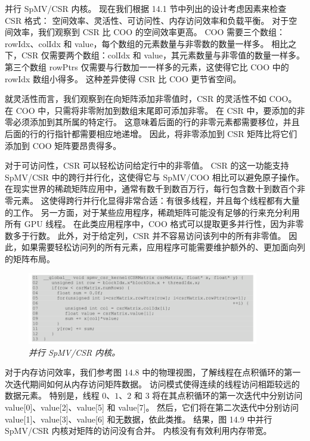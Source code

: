 并行 SpMV/CSR 内核。 现在我们根据 14.1 节中列出的设计考虑因素来检查 CSR 格式：
空间效率、灵活性、可访问性、内存访问效率和负载平衡。 对于空间效率，我们观察到 CSR 比 COO 的空间效率更高。 
COO 需要三个数组：rowIdx、colIdx 和 value，每个数组的元素数量与非零数的数量一样多。 
相比之下，CSR 仅需要两个数组：colIdx 和 value，其元素数量与非零值的数量一样多。 
第三个数组 rowPtrs 仅需要与行数加一一样多的元素，这使得它比 COO 中的 rowIdx 数组小得多。 
这种差异使得 CSR 比 COO 更节省空间。

就灵活性而言，我们观察到在向矩阵添加非零值时，CSR 的灵活性不如 COO。 
在 $\mathrm{COO}$ 中，只需将非零附加到数组末尾即可添加非零。 在 CSR 中，要添加的非零必须添加到其所属的特定行。 
这意味着后面的行的非零元素都需要移位，并且后面的行的行指针都需要相应地递增。 
因此，将非零添加到 CSR 矩阵比将它们添加到 $\mathrm{COO}$ 矩阵要昂贵得多。

对于可访问性，CSR 可以轻松访问给定行中的非零值。 
CSR 的这一功能支持 SpMV/CSR 中的跨行并行化，这使得它与 SpMV/COO 相比可以避免原子操作。 
在现实世界的稀疏矩阵应用中，通常有数千到数百万行，每行包含数十到数百个非零元素。 
这使得跨行并行化显得非常合适：有很多线程，并且每个线程都有大量的工作。 
另一方面，对于某些应用程序，稀疏矩阵可能没有足够的行来充分利用所有 GPU 线程。 
在此类应用程序中，COO 格式可以提取更多并行性，因为非零数多于行数。 
此外，对于给定列，CSR 并不容易访问该列中的所有非零值。 
因此，如果需要轻松访问列的所有元素，应用程序可能需要维护额外的、更加面向列的矩阵布局。

\begin{figure}[H]
	\centering
	\includegraphics[width=0.9\textwidth]{figs/F14.9.png}
	\caption{\textit{并行 SpMV/CSR 内核。}}
\end{figure}

对于内存访问效率，我们参考图 14.8 中的物理视图，了解线程在点积循环的第一次迭代期间如何从内存访问矩阵数据。 
访问模式使得连续的线程访问相距较远的数据元素。 
特别是，线程 $0、1、2$ 和 3 将在其点积循环的第一次迭代中分别访问 value[0]、value[2]、value[5] 和 value[7]。 
然后，它们将在第二次迭代中分别访问 value[1]、value[3]、value[6] 和无数据，依此类推。 
结果，图 14.9 中并行 SpMV/CSR 内核对矩阵的访问没有合并。 内核没有有效利用内存带宽。

